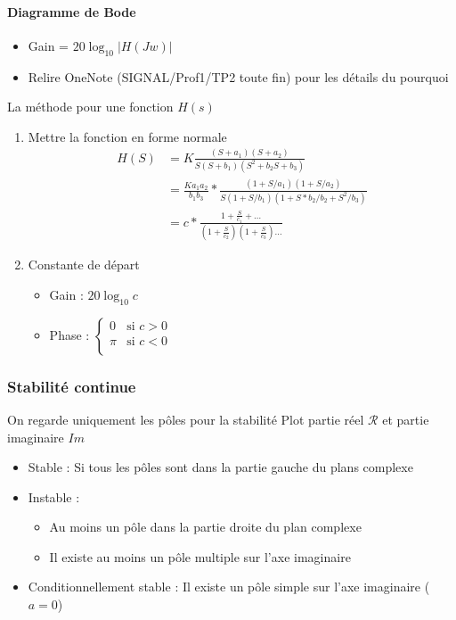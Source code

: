 \documentclass[9pt]{article}
\begin{document}
\begin{multicols}{2}
\paragraph*{Diagramme de Bode}
\begin{itemize}
    \item Gain = $ 20 \log_{10} \left| H(Jw) \right| $
    \item Relire OneNote (SIGNAL/Prof1/TP2 toute fin) pour les détails du pourquoi 
\end{itemize}
La méthode pour une fonction $ H(s) $ 
\begin{enumerate}
    \item Mettre la fonction en forme normale 
    \begin{align*}
        H(S) &= K \frac{(S + a_1)(S+a_2)}{S(S+b_1)(S^2 + b_2 S + b_3)} \\
            &= \frac{K a_1 a_2}{b_1 b_3} * \frac{(1 + S/a_1)(1+S/a_2)}{S(1+S/b_1)(1 + S*b_2/b_2 + S^2/b_3)} \\ 
            &= c * \frac{1 + \frac{S}{c_1} + \dots}{(1 + \frac{S}{c_2})(1 + \frac{S}{c_3})\dots}
    \end{align*}
    \item Constante de départ \begin{itemize}
        \item Gain : $ 20 \log_{10} c $ 
        \item Phase : $ \begin{cases}
        0 &\text{si } c>0 \\
        \pi  &\text{si }c < 0 \\
        \end{cases}  $ 
    \end{itemize} 

\end{enumerate}

\subsubsection{Stabilité continue}
On regarde uniquement les pôles pour la stabilité 
Plot partie réel $ \mathcal{R} $ et partie imaginaire $ Im $ 
\begin{itemize}
    \item Stable : Si tous les pôles sont dans la partie gauche du plans complexe
    \item Instable : \begin{itemize}
        \item Au moins un pôle dans la partie droite du plan complexe
        \item Il existe au moins un pôle multiple sur l'axe imaginaire
    \end{itemize}
    \item Conditionnellement stable : Il existe un pôle simple sur l'axe imaginaire ($a=0$)
\end{itemize}


\end{multicols}
\end{document}
